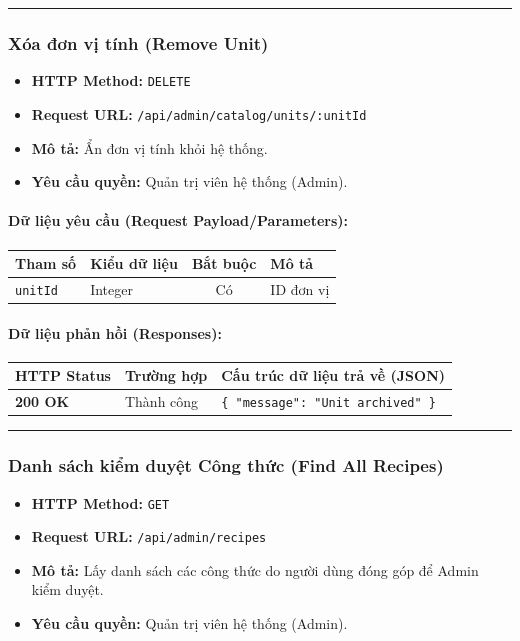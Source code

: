 \documentclass[12pt,a4paper]{article}
\begin{document}
\vskip 0.4cm
\noindent\rule{\textwidth}{0.3pt}
\vskip 0.4cm

\subsubsection{Xóa đơn vị tính (Remove Unit)}
\begin{itemize}[leftmargin=*]
    \item \textbf{HTTP Method:} \texttt{DELETE}
    \item \textbf{Request URL:} \texttt{/api/admin/catalog/units/:unitId}
    \item \textbf{Mô tả:} Ẩn đơn vị tính khỏi hệ thống.
    \item \textbf{Yêu cầu quyền:} Quản trị viên hệ thống (Admin).
\end{itemize}

\paragraph{Dữ liệu yêu cầu (Request Payload/Parameters):}
\begin{longtable}{|>{\raggedright\arraybackslash}p{2.8cm}|>{\raggedright\arraybackslash}p{2.2cm}|c|>{\raggedright\arraybackslash}p{7.0cm}|}
\hline
\textbf{Tham số} & \textbf{Kiểu dữ liệu} & \textbf{Bắt buộc} & \textbf{Mô tả} \\ \hline
\endhead
\texttt{unitId} & Integer & Có & ID đơn vị \\ \hline
\end{longtable}

\paragraph{Dữ liệu phản hồi (Responses):}
\begin{longtable}{|>{\raggedright\arraybackslash}p{2.8cm}|>{\raggedright\arraybackslash}p{3.2cm}|>{\raggedright\arraybackslash}p{8.0cm}|}
\hline
\textbf{HTTP Status} & \textbf{Trường hợp} & \textbf{Cấu trúc dữ liệu trả về (JSON)} \\ \hline
\endhead
\textbf{200 OK} & Thành công & \texttt{\{ "message": "Unit archived" \}} \\ \hline
\end{longtable}

\vskip 0.4cm
\noindent\rule{\textwidth}{0.3pt}
\vskip 0.4cm

\subsubsection{Danh sách kiểm duyệt Công thức (Find All Recipes)}
\begin{itemize}[leftmargin=*]
    \item \textbf{HTTP Method:} \texttt{GET}
    \item \textbf{Request URL:} \texttt{/api/admin/recipes}
    \item \textbf{Mô tả:} Lấy danh sách các công thức do người dùng đóng góp để Admin kiểm duyệt.
    \item \textbf{Yêu cầu quyền:} Quản trị viên hệ thống (Admin).
\end{itemize}
\end{document}
